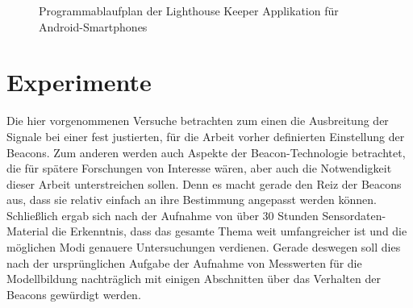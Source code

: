 \begin{figure}[H]
\caption{Programmablaufplan der Lighthouse Keeper Applikation für Android-Smartphones}
\label{fig:AppAblauf}
\end{figure}
\section{Experimente}
Die hier vorgenommenen Versuche betrachten zum einen die Ausbreitung der Signale bei einer fest justierten, für die Arbeit vorher definierten Einstellung der Beacons. Zum anderen werden auch Aspekte der Beacon-Technologie betrachtet, die für spätere Forschungen von Interesse wären, aber auch die Notwendigkeit dieser Arbeit unterstreichen sollen. Denn es macht gerade den Reiz der Beacons aus, dass sie relativ einfach an ihre Bestimmung angepasst werden können. Schließlich ergab sich nach der Aufnahme von über 30 Stunden Sensordaten-Material die Erkenntnis, dass das gesamte Thema weit umfangreicher ist und die möglichen Modi genauere Untersuchungen verdienen. Gerade deswegen soll dies nach der ursprünglichen Aufgabe der Aufnahme von Messwerten für die Modellbildung nachträglich mit einigen Abschnitten über das Verhalten der Beacons gewürdigt werden.
